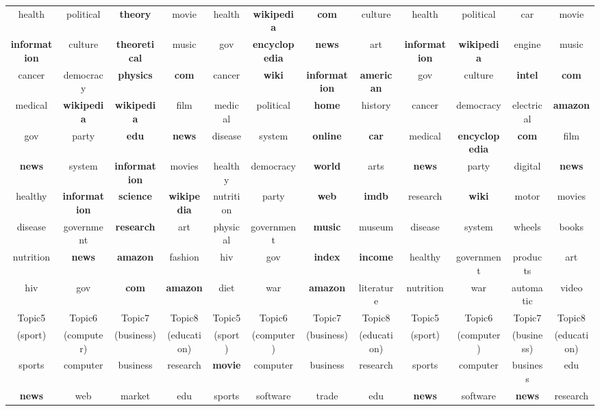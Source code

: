 \documentclass[10pt,journal,compsoc]{IEEEtran}
\begin{document}
{\begin{table}
{\begin{tabular}{|cccc|cccc|cccc|}
    \hline
    {health}&{political}&{\textbf{theory}}&{movie}&{health}&{\textbf{wikipedia}}&{\textbf{com}}&{culture}&{health}&{political}&{car}&{movie}\\
    \textbf{information}&{culture}&{\textbf{theoretical}}&{music}&{gov}&\textbf{encyclopedia}&{\textbf{news}}&{art}&\textbf{information}&{\textbf{wikipedia}}&{engine}&{music}\\
    {cancer}&{democracy}&{\textbf{physics}}&\textbf{com}&{cancer}&{\textbf{wiki}}&{\textbf{information}}&{\textbf{american}}&{gov}&{culture}&{\textbf{intel}}&\textbf{com}\\
    {medical}&{\textbf{wikipedia}}&{\textbf{wikipedia}}&{film}&{medical}&{political}&{\textbf{home}}&{history}&{cancer}&{democracy}&{electrical}&{\textbf{amazon}}\\
    {gov}&{party}&{\textbf{edu}}&\textbf{news}&{disease}&{system}&{\textbf{online}}&{\textbf{car}}&{medical}&{\textbf{encyclopedia}}&\textbf{com}&{film}\\
    \textbf{news}&{system}&{\textbf{information}}&{movies}&{healthy}&{democracy}&{\textbf{world}}&{arts}&\textbf{news}&{party}&{digital}&\textbf{news}\\
    {healthy}&\textbf{information}&{\textbf{science}}&{\textbf{wikipedia}}&{nutrition}&{party}&{\textbf{web}}&{\textbf{imdb}}&{research}&{\textbf{wiki}}&{motor}&{movies}\\
    {disease}&{government}&{\textbf{research}}&{art}&{physical}&{government}&{\textbf{music}}&{museum}&{disease}&{system}&{wheels}&{books}\\
    {nutrition}&\textbf{news}&{\textbf{amazon}}&{fashion}&{hiv}&{gov}&{\textbf{index}}&{\textbf{income}}&{healthy}&{government}&{products}&{art}\\
    {hiv}&{gov}&{\textbf{com}}&{\textbf{amazon}}&{diet}&{war}&{\textbf{amazon}}&{literature}&{nutrition}&{war}&{automatic}&{video}\\
    \hline
    {Topic5}&{Topic6}&{Topic7}&{Topic8}&{Topic5}&{Topic6}&{Topic7}&{Topic8}&{Topic5}&{Topic6}&{Topic7}&{Topic8}\\
    {(sport)}&{(computer)}&{(business)}&{(education)}&{(sport)}&{(computer)}&{(business)}&{(education)}&{(sport)}&{(computer)}&{(business)}&{(education)}\\
    \hline
    {sports}&{computer}&{business}&{research}&{\textbf{movie}}&{computer}&{business}&{research}&{sports}&{computer}&{business}&{edu}\\
    \textbf{news}&{web}&{market}&{edu}&{sports}&{software}&{trade}&{edu}&\textbf{news}&{software}&\textbf{news}&{research}\\

\end{tabular}}
\end{table}}
\end{document}
